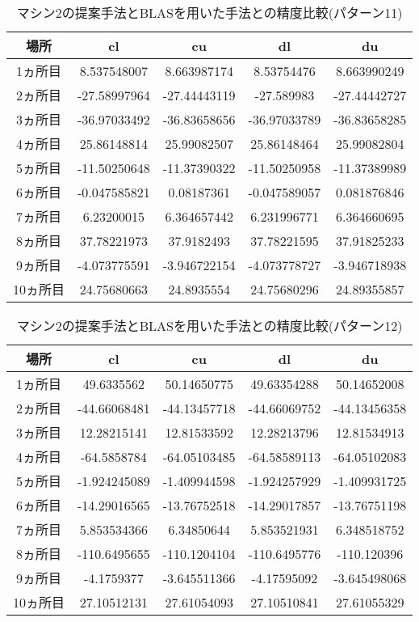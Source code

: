 \documentclass[11pt,a4paper]{jsreport}
\theoremstyle{definition}
\begin{document}
\begin{table}[H]
\centering
\begin{tabular}{|c|c|c|c|c|}
\hline
場所 & cl & cu & dl & du \\ \hline
1ヵ所目 & 8.537548007 & 8.663987174 & 8.53754476 & 8.663990249 \\ \hline
2ヵ所目 & -27.58997964 & -27.44443119 & -27.589983 & -27.44442727 \\ \hline
3ヵ所目 & -36.97033492 & -36.83658656 & -36.97033789 & -36.83658285 \\ \hline
4ヵ所目 & 25.86148814 & 25.99082507 & 25.86148464 & 25.99082804 \\ \hline
5ヵ所目 & -11.50250648 & -11.37390322 & -11.50250958 & -11.37389989 \\ \hline
6ヵ所目 & -0.047585821 & 0.08187361 & -0.047589057 & 0.081876846 \\ \hline
7ヵ所目 & 6.23200015 & 6.364657442 & 6.231996771 & 6.364660695 \\ \hline
8ヵ所目 & 37.78221973 & 37.9182493 & 37.78221595 & 37.91825233 \\ \hline
9ヵ所目 & -4.073775591 & -3.946722154 & -4.073778727 & -3.946718938 \\ \hline
10ヵ所目 & 24.75680663 & 24.8935554 & 24.75680296 & 24.89355857 \\ \hline
\end{tabular}
\caption{マシン2の提案手法とBLASを用いた手法との精度比較(パターン11)}
\end{table}

\begin{table}[H]
\centering
\begin{tabular}{|c|c|c|c|c|}
\hline
場所 & cl & cu & dl & du \\ \hline
1ヵ所目 & 49.6335562 & 50.14650775 & 49.63354288 & 50.14652008 \\ \hline
2ヵ所目 & -44.66068481 & -44.13457718 & -44.66069752 & -44.13456358 \\ \hline
3ヵ所目 & 12.28215141 & 12.81533592 & 12.28213796 & 12.81534913 \\ \hline
4ヵ所目 & -64.5858784 & -64.05103485 & -64.58589113 & -64.05102083 \\ \hline
5ヵ所目 & -1.924245089 & -1.409944598 & -1.924257929 & -1.409931725 \\ \hline
6ヵ所目 & -14.29016565 & -13.76752518 & -14.29017857 & -13.76751198 \\ \hline
7ヵ所目 & 5.853534366 & 6.34850644 & 5.853521931 & 6.348518752 \\ \hline
8ヵ所目 & -110.6495655 & -110.1204104 & -110.6495776 & -110.120396 \\ \hline
9ヵ所目 & -4.1759377 & -3.645511366 & -4.17595092 & -3.645498068 \\ \hline
10ヵ所目 & 27.10512131 & 27.61054093 & 27.10510841 & 27.61055329 \\ \hline
\end{tabular}
\caption{マシン2の提案手法とBLASを用いた手法との精度比較(パターン12)}
\end{table}
\end{document}
